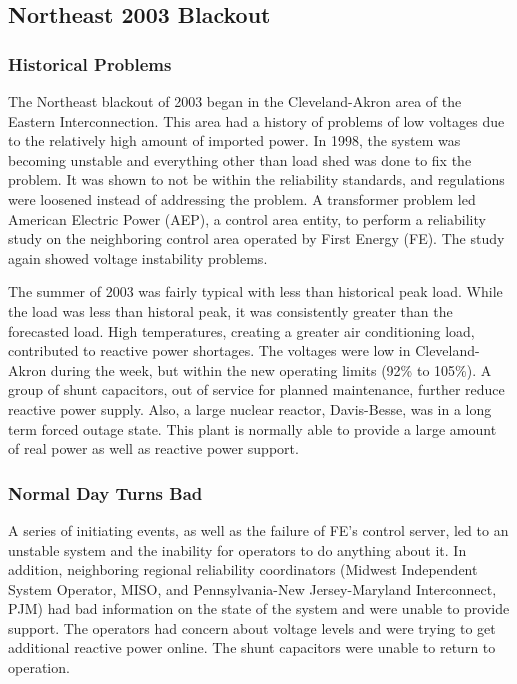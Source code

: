 \subsection{Northeast 2003 Blackout} 


\subsubsection{Historical Problems}
The Northeast blackout of 2003 began in the Cleveland-Akron area of the Eastern Interconnection.  This area had a history of problems of low voltages due to the relatively high amount of imported power.  In 1998, the system was becoming unstable and everything other than load shed was done to fix the problem.  It was shown to not be within the reliability standards, and regulations were loosened instead of addressing the problem.  A transformer problem led American Electric Power (AEP), a control area entity, to perform a reliability study on the neighboring control area operated by First Energy (FE).  The study again showed voltage instability problems.

The summer of 2003 was fairly typical with less than historical peak load.  While the load was less than historal peak, it was consistently greater than the forecasted load.  High temperatures, creating a greater air conditioning load, contributed to reactive power shortages.  The voltages were low in Cleveland-Akron during the week, but within the new operating limits (92\% to 105\%).  A group of shunt capacitors, out of service for planned maintenance, further reduce reactive power supply.  Also, a large nuclear reactor, Davis-Besse, was in a long term forced outage state.  This plant is normally able to provide a large amount of real power as well as reactive power support.

\subsubsection{Normal Day Turns Bad}
A series of initiating events, as well as the failure of FE's control server, led to an unstable system and the inability for operators to do anything about it.  In addition, neighboring regional reliability coordinators (Midwest Independent System Operator, MISO, and Pennsylvania-New Jersey-Maryland Interconnect, PJM) had bad information on the state of the system and were unable to provide support.  The operators had concern about voltage levels and were trying to get additional reactive power online.  The shunt capacitors were unable to return to operation.

